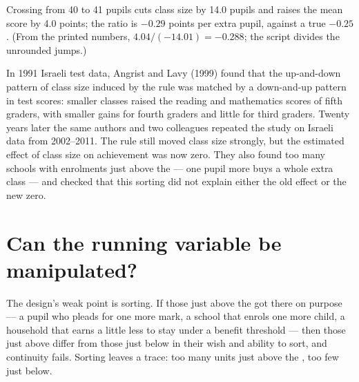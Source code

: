 \label{out:b3:regression-discontinuity:fuzzy}

Crossing from 40 to 41 pupils cuts class size by 14.0 pupils and raises the mean
score by 4.0 points; the ratio is $-0.29$ points per extra pupil, against a true
$-0.25$. %
(From the printed numbers, $4.04/(-14.01) = -0.288$; the script divides the
unrounded jumps.)

\begin{record}
In 1991 Israeli test data, Angrist and Lavy (1999) found that the up-and-down
pattern of class size induced by the rule was matched by a down-and-up pattern
in test scores: smaller classes raised the reading and mathematics scores of
fifth graders, with smaller gains for fourth graders and little for third
graders. %
Twenty years later the same authors and two colleagues repeated the study on
Israeli data from 2002--2011. The rule still moved class size strongly, but
the estimated effect of class size on achievement was now zero. They also found
too many schools with enrolments just above the  --- one pupil more
buys a whole extra class --- and checked that this sorting did not explain
either the old effect or the new zero. %
\end{record}

\section{Can the running variable be manipulated?}\label{sec:b3:regression-discontinuity:manipulation}

The design's weak point is sorting. If those just above the  got there on
purpose --- a pupil who pleads for one more mark, a school that enrols one more
child, a household that earns a little less to stay under a benefit threshold
--- then those just above differ from those just below in their wish and
ability to sort, and continuity fails. Sorting leaves a trace: too many units
just above the , too few just below.

